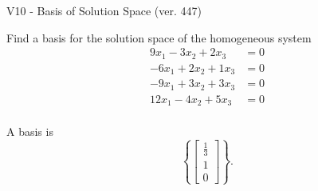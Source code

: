 \begin{exercise}
  \begin{exerciseTitle}V10 - Basis of Solution Space (ver. 447)\end{exerciseTitle}
  \begin{exerciseStatement}
    Find a basis for the solution space of the homogeneous system 
\begin{align*}
 9 x_ 1 -3 x_ 2 + 2 x_ 3 &= 0  \\ 
  -6 x_ 1 + 2 x_ 2 + 1 x_ 3 &= 0  \\ 
  -9 x_ 1 + 3 x_ 2 + 3 x_ 3 &= 0  \\ 
  12 x_ 1 -4 x_ 2 + 5 x_ 3 &= 0  \\ 
 \end{align*}


 
  \end{exerciseStatement}

  \begin{exerciseAnswer}
   A basis is   
\[\left\{\left[\begin{array}{c}
\frac{1}{3} \\
1 \\
0
\end{array}\right]\right\}.\]

  


  \end{exerciseAnswer}
\end{exercise}